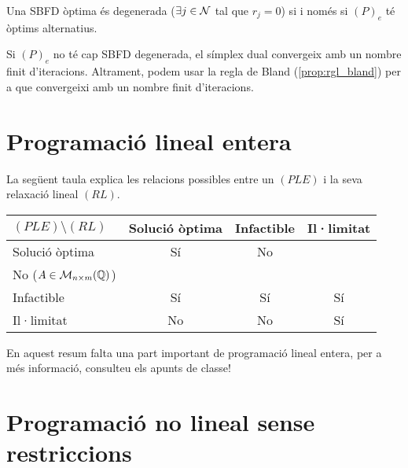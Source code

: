 \begin{prop}
    Una SBFD òptima és degenerada ($\exists j \in \mathcal{N}$ tal que $r_j = 0$) si i només si $\left(P\right)_e$ té òptims alternatius.
\end{prop}
\begin{prop}
    Si $\left(P\right)_e$ no té cap SBFD degenerada, el símplex dual convergeix amb un nombre finit d'iteracions. Altrament, podem usar la regla de Bland (\ref{prop:rgl_bland}) per a que convergeixi amb un nombre finit d'iteracions.
\end{prop}

\section{Programació lineal entera}

\begin{obs}
    La següent taula explica les relacions possibles entre un $\left(PLE\right)$ i la seva relaxació lineal $\left(RL\right)$.
    \begin{center}
        \begin{tabular}{|l|c|c|c|} \hline
            $\left(PLE\right) \setminus \left(RL\right)$ & Solució òptima & Infactible & Il·limitat \\ \hline
            Solució òptima & Sí & No & \thead{Sí ($A \in \mathcal{M}_{n\times m}(\real)$) \\ No ($A \in \mathcal{M}_{n\times m}(\mathbb{Q})$)} \\ \hline
            Infactible & Sí & Sí & Sí \\ \hline
            Il·limitat & No & No & Sí \\ \hline
        \end{tabular}
    \end{center}
\end{obs}

En aquest resum falta una part important de programació lineal entera, per a més informació, consulteu els apunts de classe!

\section{Programaci\'o no lineal sense restriccions}

